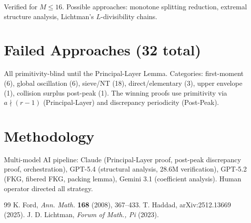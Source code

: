 \documentclass[11pt,a4paper]{article}
\theoremstyle{definition}
\begin{document}
Verified for $M \leq 16$. Possible approaches: monotone splitting reduction, extremal structure analysis, Lichtman's $L$-divisibility chains.

\section{Failed Approaches (32 total)}
All primitivity-blind until the Principal-Layer Lemma. Categories: first-moment (6), global oscillation (6), sieve/NT (18), direct/elementary (3), upper envelope (1), collision surplus post-peak (1). The winning proofs use primitivity via $a \nmid (r-1)$ (Principal-Layer) and discrepancy periodicity (Post-Peak).

\section{Methodology}
Multi-model AI pipeline: Claude (Principal-Layer proof, post-peak discrepancy proof, orchestration), GPT-5.4 (structural analysis, 28.6M verification), GPT-5.2 (FKG, fibered FKG, packing lemma), Gemini 3.1 (coefficient analysis). Human operator directed all strategy.

\begin{thebibliography}{99}
 K. Ford, \emph{Ann. Math.} \textbf{168} (2008), 367--433.
 T. Haddad, arXiv:2512.13669 (2025).
 J. D. Lichtman, \emph{Forum of Math., Pi} (2023).
\end{thebibliography}
\end{document}

